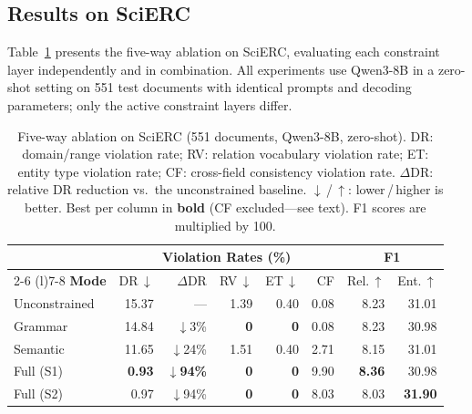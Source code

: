 
\subsection{Results on SciERC}
\label{sec:scierc-results}

Table~\ref{tab:scierc-ablation} presents the five-way ablation on SciERC,
evaluating each constraint layer independently and in combination.
All experiments use Qwen3-8B in a zero-shot setting on 551 test documents
with identical prompts and decoding parameters;
only the active constraint layers differ.

\begin{table}[t]
\centering
\small
\setlength{\tabcolsep}{3.6pt}
\begin{tabular}{@{}l rrrrr rr@{}}
\toprule
& \multicolumn{5}{c}{\textbf{Violation Rates (\%)}}
& \multicolumn{2}{c}{\textbf{F1}} \\
\cmidrule(lr){2-6} \cmidrule(l){7-8}
\textbf{Mode}
  & DR\,$\downarrow$ & $\Delta$DR
  & RV\,$\downarrow$ & ET\,$\downarrow$ & CF
  & Rel.\,$\uparrow$ & Ent.\,$\uparrow$ \\
\midrule
Unconstrained
  & 15.37 & ---
  & 1.39  & 0.40
  & 0.08
  & 8.23  & 31.01 \\
Grammar
  & 14.84 & $\downarrow$3\%
  & \textbf{0} & \textbf{0}
  & 0.08
  & 8.23  & 30.98 \\
Semantic
  & 11.65 & $\downarrow$24\%
  & 1.51  & 0.40
  & 2.71
  & 8.15  & 31.01 \\
Full (S1)
  & \textbf{0.93} & $\downarrow$\textbf{94\%}
  & \textbf{0} & \textbf{0}
  & 9.90
  & \textbf{8.36} & 30.98 \\
Full (S2)
  & 0.97  & $\downarrow$94\%
  & \textbf{0} & \textbf{0}
  & 8.03
  & 8.03  & \textbf{31.90} \\
\bottomrule
\end{tabular}
\caption{Five-way ablation on SciERC (551 documents, Qwen3-8B, zero-shot).
DR: domain/range violation rate;
RV: relation vocabulary violation rate;
ET: entity type violation rate;
CF: cross-field consistency violation rate.
$\Delta$DR: relative DR reduction vs.\ the unconstrained baseline.
$\downarrow$\,/\,$\uparrow$: lower\,/\,higher is better.
Best per column in \textbf{bold} (CF excluded---see text).
F1 scores are multiplied by 100.}
\label{tab:scierc-ablation}
\end{table}

